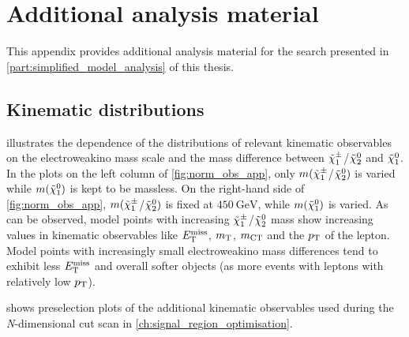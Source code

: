 
\chapter{Additional analysis material}

\graphicspath{{chapter-analysis/Figs/}}

This appendix provides additional analysis material for the \onelepton search presented in \cref{part:simplified_model_analysis} of this thesis.

\section{Kinematic distributions}\label{app:kinematic_distributions}

 illustrates the dependence of the distributions of relevant kinematic observables on the electroweakino mass scale and the mass difference between $\tilde{\chi}_1^\pm$/$\tilde{\chi}_2^0$ and $\tilde{\chi}_1^0$. In the plots on the left column of \cref{fig:norm_obs_app}, only \mbox{$m(\tilde{\chi}_1^\pm$/$\tilde{\chi}_2^0)$} is varied while $m(\tilde{\chi}_1^0)$ is kept to be massless. On the right-hand side of \cref{fig:norm_obs_app}, \mbox{$m(\tilde{\chi}_1^\pm$/$\tilde{\chi}_2^0)$} is fixed at $\SI{450}{\GeV}$, while $m(\tilde{\chi}_1^0)$ is varied. As can be observed, model points with increasing \mbox{$\tilde{\chi}_1^\pm$/$\tilde{\chi}_2^0$} mass show increasing values in kinematic observables like $E_{\textrm{T}}^{\textrm{miss}}$, $m_{\textrm{T}}$, $m_{\textrm{CT}}$ and the $p_{\mathrm{T}}$ of the lepton. Model points with increasingly small electroweakino mass differences tend to exhibit less $E_{\textrm{T}}^{\textrm{miss}}$ and overall softer objects (as \eg more events with leptons with relatively low $p_{\mathrm{T}}$).

 shows preselection plots of the additional kinematic observables used during the \textit{N}-dimensional cut scan in \cref{ch:signal_region_optimisation}.

